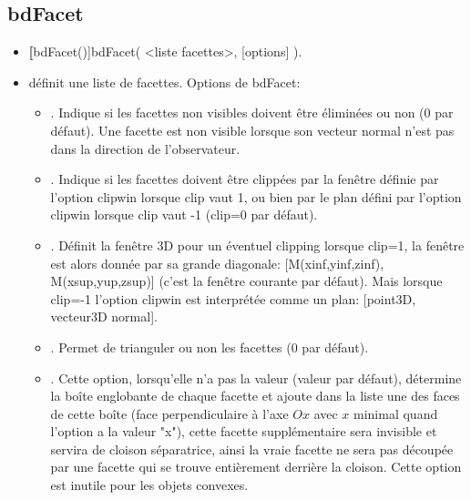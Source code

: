 \subsection{bdFacet}\label{macbdFacet}

\begin{itemize}
 \item \util \textbf[bdFacet()]{bdFacet( <liste facettes>, [options] )}.
 \item \desc définit une liste de facettes. Options de bdFacet:

\begin{itemize}
   \item {}. Indique si les facettes non visibles doivent être éliminées ou non (0 par défaut). Une facette est non visible lorsque son vecteur normal n'est pas dans la direction de l'observateur.

   \item {}. Indique si les facettes doivent être clippées par la fenêtre définie par l'option \textcolor{\coloropt}{clipwin} lorsque \textcolor{\coloropt}{clip} vaut 1, ou bien par le plan défini par l'option \textcolor{\coloropt}{clipwin} lorsque \textcolor{\coloropt}{clip} vaut -1 (clip=0 par défaut).

   \item {}. Définit la fenêtre 3D pour un éventuel clipping lorsque \textcolor{\coloropt}{clip}=1, la fenêtre est alors donnée par sa grande diagonale: [M(xinf,yinf,zinf), M(xsup,yup,zsup)] (c'est la fenêtre courante par défaut). Mais lorsque \textcolor{\coloropt}{clip}=-1 l'option \textcolor{\coloropt}{clipwin} est interprétée comme un plan: [point3D, vecteur3D normal].

   \item {}. Permet de trianguler ou non les facettes ($0$ par défaut).

   \item {}. Cette option, lorsqu'elle n'a pas la valeur \Nil (valeur par défaut), détermine la boîte englobante de chaque facette et ajoute dans la liste une des faces de cette boîte (face perpendiculaire à l'axe $Ox$ avec $x$ minimal quand l'option a la valeur "x"), cette facette supplémentaire sera invisible et servira de cloison séparatrice, ainsi la \og vraie\fg{} facette ne sera pas découpée par une facette qui se trouve entièrement derrière la cloison. Cette option est inutile pour les objets convexes.


\end{itemize}
\end{itemize}
